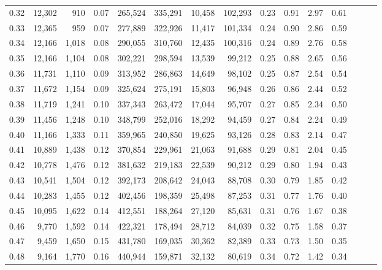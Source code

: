 \begin{tabular}{rrrrrrrrrrrrrrr}
0.32 &  12,302 &    910 &  0.07 &  265,524 &  335,291 &   10,458 &  102,293 &  0.23 &  0.91 &  2.97 &      0.61 \\
0.33 &  12,365 &    959 &  0.07 &  277,889 &  322,926 &   11,417 &  101,334 &  0.24 &  0.90 &  2.86 &      0.59 \\
0.34 &  12,166 &  1,018 &  0.08 &  290,055 &  310,760 &   12,435 &  100,316 &  0.24 &  0.89 &  2.76 &      0.58 \\
0.35 &  12,166 &  1,104 &  0.08 &  302,221 &  298,594 &   13,539 &   99,212 &  0.25 &  0.88 &  2.65 &      0.56 \\
0.36 &  11,731 &  1,110 &  0.09 &  313,952 &  286,863 &   14,649 &   98,102 &  0.25 &  0.87 &  2.54 &      0.54 \\
0.37 &  11,672 &  1,154 &  0.09 &  325,624 &  275,191 &   15,803 &   96,948 &  0.26 &  0.86 &  2.44 &      0.52 \\
0.38 &  11,719 &  1,241 &  0.10 &  337,343 &  263,472 &   17,044 &   95,707 &  0.27 &  0.85 &  2.34 &      0.50 \\
0.39 &  11,456 &  1,248 &  0.10 &  348,799 &  252,016 &   18,292 &   94,459 &  0.27 &  0.84 &  2.24 &      0.49 \\
0.40 &  11,166 &  1,333 &  0.11 &  359,965 &  240,850 &   19,625 &   93,126 &  0.28 &  0.83 &  2.14 &      0.47 \\
0.41 &  10,889 &  1,438 &  0.12 &  370,854 &  229,961 &   21,063 &   91,688 &  0.29 &  0.81 &  2.04 &      0.45 \\
0.42 &  10,778 &  1,476 &  0.12 &  381,632 &  219,183 &   22,539 &   90,212 &  0.29 &  0.80 &  1.94 &      0.43 \\
0.43 &  10,541 &  1,504 &  0.12 &  392,173 &  208,642 &   24,043 &   88,708 &  0.30 &  0.79 &  1.85 &      0.42 \\
0.44 &  10,283 &  1,455 &  0.12 &  402,456 &  198,359 &   25,498 &   87,253 &  0.31 &  0.77 &  1.76 &      0.40 \\
0.45 &  10,095 &  1,622 &  0.14 &  412,551 &  188,264 &   27,120 &   85,631 &  0.31 &  0.76 &  1.67 &      0.38 \\
0.46 &   9,770 &  1,592 &  0.14 &  422,321 &  178,494 &   28,712 &   84,039 &  0.32 &  0.75 &  1.58 &      0.37 \\
0.47 &   9,459 &  1,650 &  0.15 &  431,780 &  169,035 &   30,362 &   82,389 &  0.33 &  0.73 &  1.50 &      0.35 \\
0.48 &   9,164 &  1,770 &  0.16 &  440,944 &  159,871 &   32,132 &   80,619 &  0.34 &  0.72 &  1.42 &      0.34 \\

\end{tabular}
